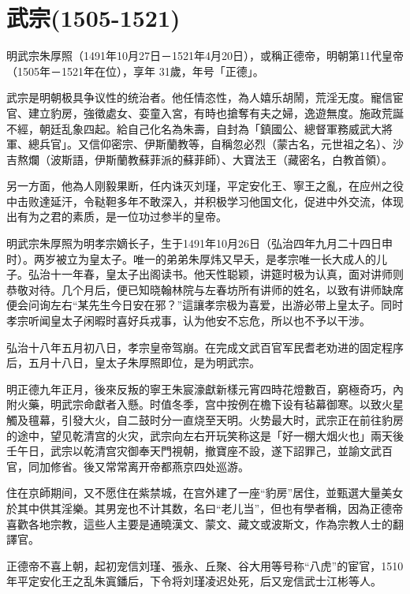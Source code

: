 
\section{武宗\tiny(1505-1521)}

明武宗朱厚照（1491年10月27日－1521年4月20日），或稱正德帝，明朝第11代皇帝（1505年－1521年在位），享年 31歲，年号「正德」。

武宗是明朝极具争议性的统治者。他任情恣性，為人嬉乐胡鬧，荒淫无度。寵信宦官、建立豹房，強徵處女、娈童入宮，有時也搶奪有夫之婦，逸遊無度。施政荒誕不經，朝廷乱象四起。給自己化名為朱壽，自封為「鎮國公、總督軍務威武大將軍、總兵官」。又信仰密宗、伊斯蘭教等，自稱忽必烈（蒙古名，元世祖之名）、沙吉熬爛（波斯語，伊斯蘭教蘇菲派的蘇菲師）、大寶法王（藏密名，白教首領）。

另一方面，他為人刚毅果断，任内诛灭刘瑾，平定安化王、寧王之亂，在应州之役中击败達延汗，令鞑靼多年不敢深入，并积极学习他国文化，促进中外交流，体现出有为之君的素质，是一位功过参半的皇帝。

明武宗朱厚照为明孝宗嫡长子，生于1491年10月26日（弘治四年九月二十四日申时）。两岁被立为皇太子。唯一的弟弟朱厚炜又早夭，是孝宗唯一长大成人的儿子。弘治十一年春，皇太子出阁读书。他天性聪颖，讲筵时极为认真，面对讲师则恭敬对待。几个月后，便已知晓翰林院与左春坊所有讲师的姓名，以致有讲师缺席便会问询左右“某先生今日安在邪？”這讓孝宗极为喜爱，出游必带上皇太子。同时孝宗听闻皇太子闲暇时喜好兵戎事，认为他安不忘危，所以也不予以干涉。

弘治十八年五月初八日，孝宗皇帝驾崩。在完成文武百官军民耆老劝进的固定程序后，五月十八日，皇太子朱厚照即位，是为明武宗。

明正德九年正月，後來反叛的寧王朱宸濠獻新樣元宵四時花燈數百，窮極奇巧，內附火藥，明武宗命獻者入懸。时值冬季，宫中按例在檐下设有毡幕御寒。以致火星觸及氊幕，引發大火，自二鼓时分一直烧至天明。火势最大时，武宗正在前往豹房的途中，望见乾清宫的火灾，武宗向左右开玩笑称这是「好一棚大烟火也」兩天後壬午日，武宗以乾清宫灾御奉天門視朝，撤寶座不設，遂下詔罪己，並諭文武百官，同加修省。後又常常离开帝都燕京四处巡游。

住在京師期间，又不愿住在紫禁城，在宫外建了一座“豹房”居住，並甄選大量美女於其中供其淫樂。其男宠也不计其数，名曰“老儿当”，但也有學者稱，因為正德帝喜歡各地宗教，這些人主要是通曉漢文、蒙文、藏文或波斯文，作為宗教人士的翻譯官。

正德帝不喜上朝，起初宠信刘瑾、張永、丘聚、谷大用等号称“八虎”的宦官，1510年平定安化王之乱朱寘鐇后，下令将刘瑾凌迟处死，后又宠信武士江彬等人。

